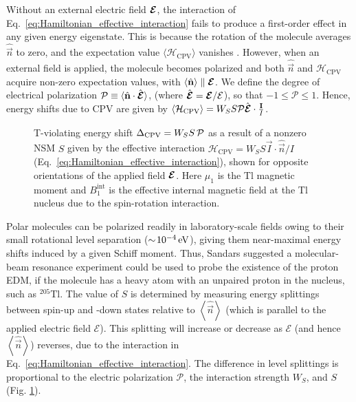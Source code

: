 Without an external electric field $\bm{\mathcal{E}}$, the interaction of Eq.~\ref{eq:Hamiltonian_effective_interaction} fails to produce a first-order effect in any given energy eigenstate. This is because the rotation of the molecule averages $\hat{\vec n}$ to zero, and the expectation value $\langle\mathcal{H}_\text{CPV}\rangle$ vanishes \cite{cho1989tenfold, cho1991search}. However, when an external field is applied, the molecule becomes polarized and both
$\hat{\vec{n}}$ and $\mathcal{H}_\text{CPV}$  acquire non-zero expectation values, with $\langle\hat{\mathbf{n}}\rangle \parallel \bm{\mathcal{E}}$. We define the degree of electrical polarization $\mathcal{P} \equiv \langle \hat{\mathbf{n}}\cdot\hat{\bm{\mathcal{E}}} \rangle$, (where $\hat{\bm{\mathcal{E}}} = \bm{\mathcal{E}}/\mathcal{E}$), so that $-1\leq\mathcal{P}\leq1$. 
Hence, energy shifts due to CPV are given by  $\langle\mathcal{H}_\text{CPV}\rangle = W_S S \mathcal{P} \hat{\bm{\mathcal{E}}} \cdot \frac{\mathbf{I}}{I}$.

\begin{figure}
    \centering
    \def\svgwidth{0.5\textwidth}
    
	\caption{T-violating energy shift $\Delta_{\rm CPV} = W_SS\,\mathcal{P}$ as a result of a nonzero NSM $S$ given by the effective interaction $\mathcal{H}_\text{CPV}= W_S S\vec{I}\cdot \hat{\vec{n}}/I$ (Eq.~\ref{eq:Hamiltonian_effective_interaction}), shown for opposite orientations of the applied field $\bm{\mathcal{E}}$. Here $\mu_1$ is the Tl magnetic moment and $B_1^\mathrm{int}$ is the effective internal magnetic field at the Tl nucleus due to the spin-rotation interaction.
	}
	\label{fig:edm_shift}
\end{figure}

Polar molecules can be polarized readily in laboratory-scale fields owing to their small rotational level separation ($\sim\!10^{-4}\,\mathrm{eV}$), giving them near-maximal energy shifts induced by a given Schiff moment. Thus, Sandars \cite{sandars1967measurability} suggested a molecular-beam resonance experiment could be used to probe the existence of the proton EDM, if the molecule has a heavy atom with an unpaired proton in the nucleus, such as $^{205}\mathrm{Tl}$. The value of $S$ is determined by measuring energy splittings between spin-up and -down states relative to $\left\langle \hat{\vec{n}}\right\rangle$ (which is parallel to the applied electric field $\bm{\mathcal{E}}$). This splitting will increase or decrease as $\bm{\mathcal{E}}$ (and hence $\left\langle \hat{\vec{n}}\right\rangle$) reverses, due to the interaction in Eq.~\ref{eq:Hamiltonian_effective_interaction}. The difference in level splittings is proportional to the electric polarization $\mathcal{P}$, the interaction strength $W_S$, and $S$ (Fig. \ref{fig:edm_shift}).


